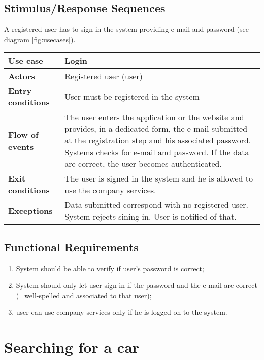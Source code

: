 \documentclass{scrreprt}
\begin{document}
\subsection{Stimulus/Response Sequences}
A registered user has to sign in the system providing e-mail and password (see diagram \vref{fig:usecases}).

\begin{center}
\begin{tabularx}{\columnwidth}{>{\bfseries}lX}
\toprule
Use case & Login\\
\midrule
Actors & Registered user (user)\\
\midrule
Entry conditions & User must be registered in the system\\
\midrule
Flow of events & The user enters the application or the website and provides, in a dedicated form, the e-mail submitted at the registration step and his associated password. Systems checks for e-mail and password. If the data are correct, the user becomes authenticated.\\
\midrule
Exit conditions & The user is signed in the system and he is allowed to use the company services.\\
\midrule
Exceptions & Data submitted correspond with no registered user. System rejects sining in. User is notified of that.\\
\bottomrule
\end{tabularx}
\end{center}

\subsection{Functional Requirements}

\begin{enumerate}[label=R\arabic*.,resume]
\item System should be able to verify if user's password is correct;
\item System should only let user sign in if the password and the e-mail are correct (=well-spelled and associated to that user);
\item user can use company services only if he is logged on to the system.
\end{enumerate}

\section{Searching for a car}
\end{document}
